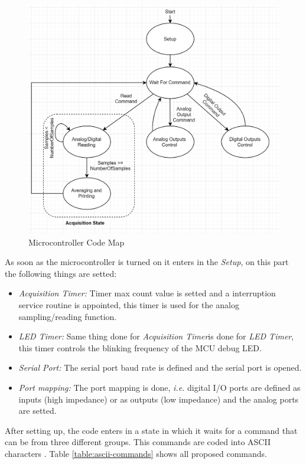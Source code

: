 	\begin{figure}[htbp]
		\centering
		\includegraphics[width=.8\textwidth]{figuras/fig-microCodeMap}
		\caption{Microcontroller Code Map}
		\label{fig:microCode}
	\end{figure}
	
	
	As soon as the microcontroller is turned on it enters in the \textit{Setup}, on this part the following things are setted:
	\begin{itemize}
		\item \textit{Acquisition Timer:} Timer max count value is setted and a interruption service routine is appointed, this timer is used for the analog sampling/reading function.\label{itm:mcu-prog-timer1}
		\item \textit{LED Timer:} Same thing done for \textit{Acquisition Timer}is done for \textit{LED Timer}, this timer controls the blinking frequency of the MCU debug LED.\label{itm:mcu-prog-timer2}
		\item \textit{Serial Port: } The serial port baud rate is defined and the serial port is opened.\label{itm:mcu-prog-serial-port}
		\item \textit{Port mapping: } The port mapping is done, \textit{i.e.} digital I/O ports are defined as inputs (high impedance) or as outputs (low impedance) and the analog ports are setted.\label{itm:mcu-prog-port}
	\end{itemize}
	
	After setting up, the code enters in a state in which it waits for a command that can be from three different groups. This commands are coded into ASCII characters \cite{ascii}. Table \ref{table:ascii-commands} shows all proposed commands.

